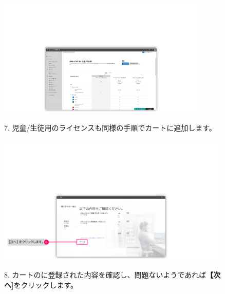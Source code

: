 \begin{figure}[h]
    \begin{minipage}{0.6\textwidth}
        \vspace{-1.4cm}
        \includegraphics[width=10cm]{figures/O365A1_buy02.png}
    \end{minipage}
    \begin{minipage}{0.4\textwidth}
        7. 児童/生徒用のライセンスも同様の手順でカートに追加します。
    \end{minipage}
\end{figure}

\begin{figure}[h]
    \begin{minipage}{0.6\textwidth}
        \vspace{-1.8cm}\hspace{-0.6cm}
        \includegraphics[width=11cm]{figures/O365A1_buy03.png}
    \end{minipage}
    \begin{minipage}{0.4\textwidth}
        8. カートのに登録された内容を確認し、問題ないようであれば\textbf{【次へ]}をクリックします。
    \end{minipage}
\end{figure}

